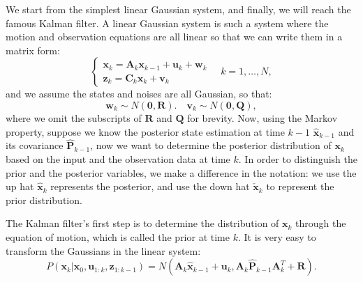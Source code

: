We start from the simplest linear Gaussian system, and finally, we will reach the famous Kalman filter. A linear Gaussian system is such a system where the motion and observation equations are all linear so that we can write them in a matrix form:
\begin{equation}
	\left\{ \begin{array}{l}
		{\mathbf{x}_k} = \mathbf{A}_k {{\mathbf{x}_{k - 1}}+{\mathbf{u}_k}} + \mathbf{w}_k \\
		{\mathbf{z}_{k}} = \mathbf{C}_k  { \mathbf{x}_k} + \mathbf{v}_{k} \end{array} \right. \quad k=1, \ldots, N ,
\end{equation}
and we assume the states and noises are all Gaussian, so that: 
\begin{equation}
	\mathbf{w}_k \sim N(\mathbf{0}, \mathbf{R}). \quad \mathbf{v}_k \sim N( \mathbf{0}, \mathbf{Q}),
\end{equation}
where we omit the subscripts of $\mathbf{R}$ and $\mathbf{Q}$ for brevity. Now, using the Markov property, suppose we know the posterior state estimation at time $k-1$ $\mathbf{\hat{x}}_{k-1} $ and its covariance $\mathbf{\hat{P}}_{k-1}$, now we want to determine the posterior distribution of $\mathbf{x}_k$ based on the input and the observation data at time $k$. In order to distinguish the prior and the posterior variables, we make a difference in the notation: we use the up hat $\mathbf{\hat{x}}_k$ represents the posterior, and use the down hat $\check{\mathbf{x}}_k $ to represent the prior distribution. 

The Kalman filter's first step is to determine the distribution of $\mathbf{x}_k$ through the equation of motion, which is called the prior at time $k$. It is very easy to transform the Gaussians in the linear system: 
\begin{equation}
	P\left( {{\mathbf{x}_k}|{\mathbf{x}_0},{\mathbf{u}_{1:k}},{\mathbf{z}_{1:k - 1}}} \right) = N\left( {\mathbf{A}_k {{\hat{\mathbf{x}}}_{k - 1}} + {\mathbf{u}_k}, \mathbf{A}_k\hat{\mathbf{P}}_{k-1} {\mathbf{A}_k^T} + \mathbf{R}} \right).
\end{equation}

